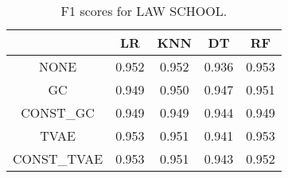 \begin{table}
\caption{F1 scores for LAW SCHOOL.}
\label{tab:f1-LAW SCHOOL}
\begin{tabular}{ccccc}
\toprule
 & LR & KNN & DT & RF \\
\midrule
NONE & 0.952 & 0.952 & 0.936 & 0.953 \\
GC & 0.949 & 0.950 & 0.947 & 0.951 \\
CONST\_GC & 0.949 & 0.949 & 0.944 & 0.949 \\
TVAE & 0.953 & 0.951 & 0.941 & 0.953 \\
CONST\_TVAE & 0.953 & 0.951 & 0.943 & 0.952 \\
\bottomrule
\end{tabular}
\end{table}
